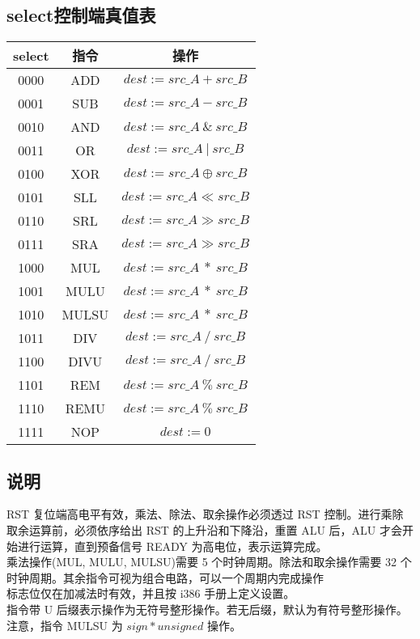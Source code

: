 \subsection{select控制端真值表}
\begin{tabular}{|c|c|c|}
    \hline
    select      &   指令   &      操作\\\hline
    0000        &   ADD     &    ${dest := src\_A + src\_B}$\\\hline
    0001        &   SUB     &    ${dest := src\_A - src\_B}$\\\hline
    0010        &   AND     &    ${dest := src\_A\ \&\ src\_B}$\\\hline
    0011        &   OR     &     ${dest := src\_A\ |\ src\_B}$\\\hline
    0100        &   XOR     &    ${dest := src\_A \oplus src\_B}$\\\hline
    0101        &   SLL     &    ${dest := src\_A \ll src\_B}$\\\hline
    0110        &   SRL     &    ${dest := src\_A \gg src\_B}$\\\hline
    0111        &   SRA     &    ${dest := src\_A \gg src\_B}$\\\hline
    1000        &   MUL     &    ${dest := src\_A\ *\ src\_B}$\\\hline
    1001        &   MULU    &    ${dest := src\_A\ *\ src\_B}$\\\hline
    1010        &   MULSU   &    ${dest := src\_A\ *\ src\_B}$\\\hline
    1011        &   DIV     &    ${dest := src\_A\ /\ src\_B}$\\\hline
    1100        &   DIVU     &   ${dest := src\_A\ /\ src\_B}$\\\hline
    1101        &   REM     &    ${dest := src\_A\ \%\ src\_B}$\\\hline
    1110        &   REMU     &   ${dest := src\_A\ \%\ src\_B}$\\\hline
    1111        &   NOP     &    ${dest := 0}$\\\hline
\end{tabular}
\subsection{说明}
RST 复位端高电平有效，乘法、除法、取余操作必须透过 RST 控制。进行乘除取余运算前，必须依序给出 RST 的上升沿和下降沿，重置 ALU 后，ALU 才会开始进行运算，直到预备信号 READY 为高电位，表示运算完成。\\
乘法操作(MUL, MULU, MULSU)需要 5 个时钟周期。除法和取余操作需要 32 个时钟周期。其余指令可视为组合电路，可以一个周期内完成操作\\
标志位仅在加减法时有效，并且按 i386 手册上定义设置。\\
指令带 U 后缀表示操作为无符号整形操作。若无后缀，默认为有符号整形操作。注意，指令 MULSU 为 ${sign * unsigned}$ 操作。

